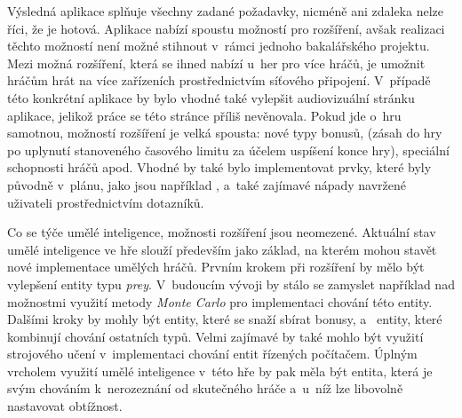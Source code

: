 Výsledná aplikace splňuje všechny zadané požadavky, nicméně ani zdaleka nelze říci, že je hotová. Aplikace nabízí spoustu možností pro rozšíření, avšak realizaci těchto možností není možné stihnout v~rámci jednoho bakalářského projektu. Mezi možná rozšíření, která se ihned nabízí u~her pro více hráčů, je umožnit hráčům hrát na více zařízeních prostřednictvím síťového připojení. V~případě této konkrétní aplikace by bylo vhodné také vylepšit audiovizuální stránku aplikace, jelikož práce se této stránce příliš nevěnovala. Pokud jde o~hru samotnou, možností rozšíření je velká spousta: nové typy bonusů,  (zásah do hry po uplynutí stanoveného časového limitu za účelem uspíšení konce hry), speciální schopnosti hráčů apod. Vhodné by také bylo implementovat prvky, které byly původně v~plánu, jako jsou například , a~také zajímavé nápady navržené uživateli prostřednictvím dotazníků.

Co se týče umělé inteligence, možnosti rozšíření jsou neomezené. Aktuální stav umělé inteligence ve hře slouží především jako základ, na kterém mohou stavět nové implementace umělých hráčů. Prvním krokem při rozšíření by mělo být vylepšení entity typu \emph{prey}. V~budoucím vývoji by stálo se zamyslet například nad možnostmi využití metody \emph{Monte Carlo} pro implementaci chování této entity. Dalšími kroky by mohly být entity, které se snaží sbírat bonusy, a~ entity, které kombinují chování ostatních typů. Velmi zajímavé by také mohlo být využití strojového učení v~implementaci chování entit řízených počítačem. Úplným vrcholem využití umělé inteligence v~této hře by pak měla být entita, která je svým chováním k~nerozeznání od skutečného hráče a~u~níž lze libovolně nastavovat obtížnost.

